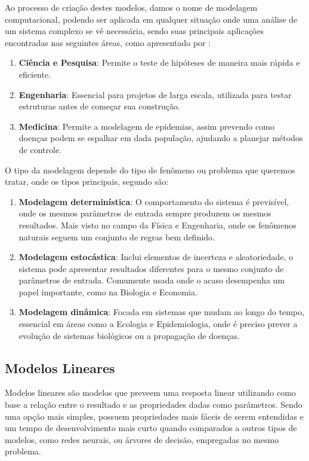 \documentclass[
    12pt,               %
    openright,          %
    oneside,            %
    a4paper,            %
    english,            %
    brazil              %
    ]{abntex2}
\begin{document}
Ao processo de criação destes modelos, damos o nome de modelagem computacional, podendo ser aplicada em
qualquer situação onde uma análise de um sistema complexo se vê necessária, sendo suas principais
aplicações encontradas nas seguintes áreas, como apresentado por \cite{modelagem_computacional}:

\begin{enumerate}
    \item \textbf{Ciência e Pesquisa}: Permite o teste de hipóteses de maneira mais rápida e eficiente.
    \item \textbf{Engenharia}: Essencial para projetos de larga escala, utilizada para testar estruturas antes de
    começar sua construção.
    \item \textbf{Medicina}: Permite a modelagem de epidemias, assim prevendo como doenças podem se espalhar em dada
    população, ajudando a planejar métodos de controle.
\end{enumerate}

O tipo da modelagem depende do tipo de fenômeno ou problema que queremos tratar, onde os tipos principais,
segundo \cite{modelagem_computacional} são:

\begin{enumerate}
    \item \textbf{Modelagem determinística}: O comportamento do sistema é previsível, onde os mesmos parâmetros de 
    entrada sempre produzem os mesmos resultados. Mais visto no campo da Física e Engenharia, onde os 
    fenômenos naturais seguem um conjunto de regras bem definido.
    \item \textbf{Modelagem estocástica}: Inclui elementos de incerteza e aleatoriedade, o sistema pode apresentar
    resultados diferentes para o mesmo conjunto de parâmetros de entrada. Comumente usada onde o acaso 
    desempenha um papel importante, como na Biologia e Economia.
    \item \textbf{Modelagem dinâmica}: Focada em sistemas que mudam ao longo do tempo, essencial em áreas como a
    Ecologia e Epidemiologia, onde é preciso prever a evolução de sistemas biológicos ou a propagação
    de doenças. 
\end{enumerate}

\subsection{Modelos Lineares}

Modelos lineares são modelos que preveem uma resposta linear utilizando como base a relação entre o resultado
e as propriedades dadas como parâmetros. Sendo uma opção mais simples, possuem propriedades mais fáceis de
serem entendidas e um tempo de desenvolvimento mais curto quando comparados a outros tipos de modelos,
como redes neurais, ou árvores de decisão, empregadas no mesmo problema. \cite{modelos_lineares}
\end{document}
